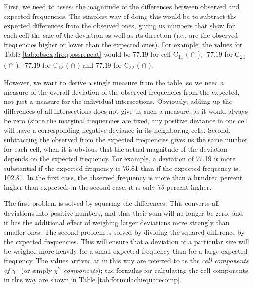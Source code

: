 First, we need to assess the magnitude of the differences between observed and expected frequencies. The simplest way of doing this would be to subtract the expected differences from the observed ones, giving us numbers that show for each cell the size of the deviation as well as its direction (i.e., are the observed frequencies higher or lower than the expected ones). For example, the values for Table \ref{tab:obsexpfreqpossrepeat} would be 77.19 for cell C\textsubscript{11} ( $\cap$ ), -77.19 for C\textsubscript{21} ( $\cap$ ), -77.19 for C\textsubscript{12} ( $\cap$ ) and 77.19 for C\textsubscript{22} ( $\cap$ ).

However, we want to derive a single measure from the table, so we need a measure of the overall deviation of the observed frequencies from the expected, not just a measure for the individual intersections. Obviously, adding up the differences of all intersections does not give us such a measure, as it would always be zero (since the marginal frequencies are fixed, any positive deviance in one cell will have a corresponding negative deviance in its neighboring cells. Second, subtracting the observed from the expected frequencies gives us the same number for each cell, when it is obvious that the actual magnitude of the deviation depends on the expected frequency. For example, a deviation of 77.19 is more substantial if the expected frequency is 75.81 than if the expected frequency is 102.81. In the first case, the observed frequency is more than a hundred percent higher than expected, in the second case, it is only 75 percent higher. 

The first problem is solved by squaring the differences. This converts all deviations into positive numbers, and thus their sum will no longer be zero, and it has the additional effect of weighing larger deviations more strongly than smaller ones. The second problem is solved by dividing the squared difference by the expected frequencies. This will ensure that a deviation of a particular size will be weighed more heavily for a small expected frequency than for a large expected frequency. The values arrived at in this way are referred to as the \textit{cell components of $\chi^2$} (or simply \textit{$\chi^2$ components}); the formulas for calculating the cell components in this way are shown in Table \ref{tab:formulachisquarecomp}. 

